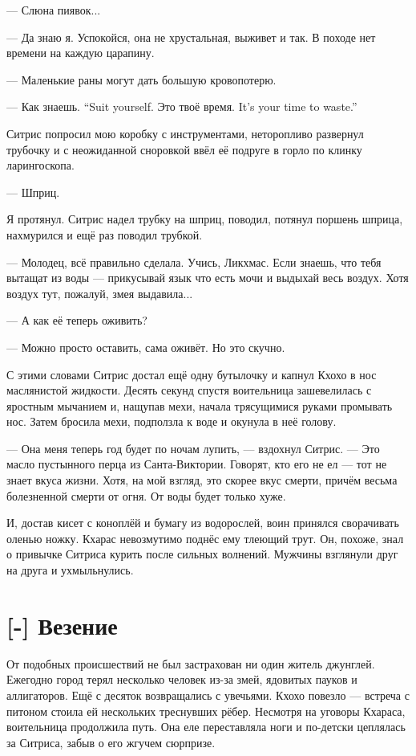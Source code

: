 --- Слюна пиявок...

--- Да знаю я.
Успокойся, она не хрустальная, выживет и так.
В походе нет времени на каждую царапину.

--- Маленькие раны могут дать большую кровопотерю.

{--- Как знаешь.}
{``Suit yourself.}
{Это твоё время.}
{It's your time to waste.''}

Ситрис попросил мою коробку с инструментами, неторопливо развернул трубочку и с неожиданной сноровкой ввёл её подруге в горло по клинку ларингоскопа.

--- Шприц.

Я протянул.
Ситрис надел трубку на шприц, поводил, потянул поршень шприца, нахмурился и ещё раз поводил трубкой.

--- Молодец, всё правильно сделала.
Учись, Ликхмас.
Если знаешь, что тебя вытащат из воды --- прикусывай язык что есть мочи и выдыхай весь воздух.
Хотя воздух тут, пожалуй, змея выдавила...

--- А как её теперь оживить?

--- Можно просто оставить, сама оживёт.
Но это скучно.

С этими словами Ситрис достал ещё одну бутылочку и капнул Кхохо в нос маслянистой жидкости.
Десять секунд спустя воительница зашевелилась с яростным мычанием и, нащупав мехи, начала трясущимися руками промывать нос.
Затем бросила мехи, подползла к воде и окунула в неё голову.

--- Она меня теперь год будет по ночам лупить, --- вздохнул Ситрис.
--- Это масло пустынного перца из Санта-Виктории.
Говорят, кто его не ел --- тот не знает вкуса жизни.
Хотя, на мой взгляд, это скорее вкус смерти, причём весьма болезненной смерти от огня.
От воды будет только хуже.

И, достав кисет с коноплёй и бумагу из водорослей, воин принялся сворачивать оленью ножку.
Кхарас невозмутимо поднёс ему тлеющий трут.
Он, похоже, знал о привычке Ситриса курить после сильных волнений.
Мужчины взглянули друг на друга и ухмыльнулись.

\section{[-] Везение}

От подобных происшествий не был застрахован ни один житель джунглей.
Ежегодно город терял несколько человек из-за змей, ядовитых пауков и аллигаторов.
Ещё с десяток возвращались с увечьями.
Кхохо повезло --- встреча с питоном стоила ей нескольких треснувших рёбер.
Несмотря на уговоры Кхараса, воительница продолжила путь.
Она еле переставляла ноги и по-детски цеплялась за Ситриса, забыв о его жгучем сюрпризе.

